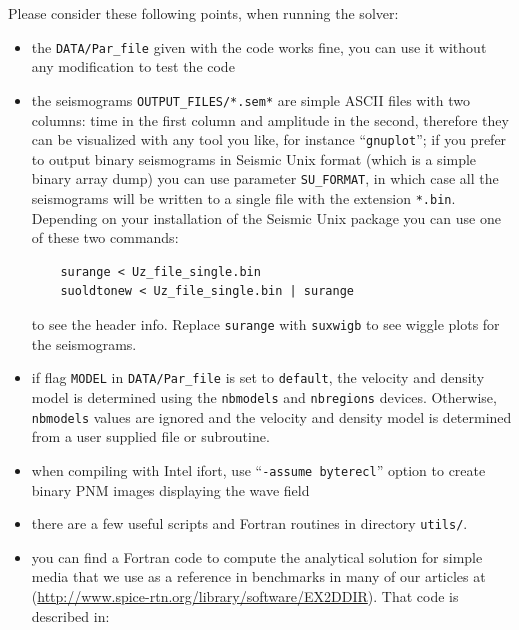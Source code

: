 \documentclass[oneside,english,onecolumn,letterpaper]{book}
\newcommand{\urlwithparentheses}[1]{(\url{#1})}
\begin{document}
Please consider these following points, when running the solver:
%
\begin{itemize}
\item the \texttt{DATA/Par\_file} given with the code works fine, you can use it without any modification to test the code

\item the seismograms \texttt{OUTPUT\_FILES/*.sem*} are simple ASCII files with two columns: time in the first column and amplitude in the second, therefore they can be visualized with any tool you like, for instance ``\texttt{gnuplot}''; if you prefer to output binary seismograms in Seismic Unix format (which is a simple binary array dump) you can use parameter \texttt{SU\_FORMAT}, in which case all the seismograms will be written to a single file with the extension \texttt{*.bin}.
Depending on your installation of the Seismic Unix package you can use one of these two commands:
%
\begin{verbatim}
    surange < Uz_file_single.bin
    suoldtonew < Uz_file_single.bin | surange
\end{verbatim}
%
to see the header info.
Replace \texttt{surange} with \texttt{suxwigb} to see wiggle plots for the seismograms.

\item if flag \texttt{MODEL} in \texttt{DATA/Par\_file} is set to \texttt{default}, the velocity and density model is determined using the \texttt{nbmodels} and \texttt{nbregions} devices.  Otherwise, \texttt{nbmodels} values are ignored and the velocity and density model is determined from a user supplied file or subroutine.

\item when compiling with Intel ifort, use ``\texttt{-assume byterecl}'' option to create binary PNM images displaying the wave field

\item there are a few useful scripts and Fortran routines in directory \texttt{utils/}.

\item you can find a Fortran code to compute the analytical solution for simple media that we use as a reference in benchmarks in many of our articles at
\urlwithparentheses{http://www.spice-rtn.org/library/software/EX2DDIR}. That code is described in: \cite{BeIfNiSk94}

\end{itemize}

\end{document}
